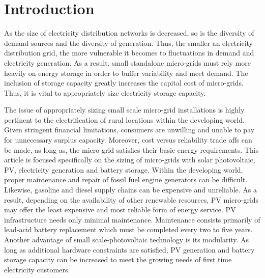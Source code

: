 \documentclass[11p]{article}
\begin{document}
\begin{abstract}

\end{abstract}

\section{Introduction}

As the size of electricity distribution networks is decreased, so is the diversity of demand sources and the diversity of generation.
Thus, the smaller an electricity distribution grid, the more vulnerable it becomes to fluctuations in demand and electricity generation.
As a result, small standalone micro-grids must rely more heavily on energy storage in order to buffer variability and meet demand.  
The inclusion of storage capacity greatly increases the capital cost of micro-grids.
Thus, it is vital to appropriately size electricity storage capacity.

The issue of appropriately sizing small scale micro-grid installations is highly pertinent to the electrification of rural locations within the developing world. 
Given stringent financial limitations, consumers are unwilling and unable to pay for unnecessary surplus capacity. 
Moreover, cost versus reliability trade offs can be made, as long as, the micro-grid satisfies their basic energy requirements. \cite{Marawanyika} 
This article is focused specifically on the sizing of micro-grids with solar photovoltaic, PV, electricity generation and battery storage. 
Within the developing world, proper maintenance and repair of fossil fuel engine generators can be difficult. 
Likewise, gasoline and diesel supply chains can be expensive and unreliable.  
As a result, depending on the availability of other renewable resources, PV micro-grids may offer the least expensive and most reliable form of energy service. \cite{Nouni,WB}
PV infrastructure needs only minimal maintenance.
Maintenance consists primarily of lead-acid battery replacement which must be completed every two to five years. 
Another advantage of small scale-photovoltaic technology is its modularity.  
As long as additional hardware constraints are satisfied, PV generation and battery storage capacity can be increased to meet the growing needs of first time electricity customers. \cite{Wamukonya}  
\end{document}
